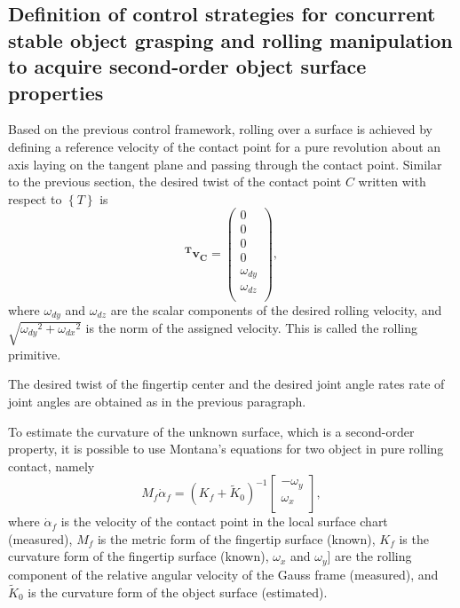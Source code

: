 \subsection{Definition of control strategies for concurrent stable object grasping and rolling manipulation to acquire second-order object surface properties}

Based on the previous control framework, rolling over a surface is achieved by defining a reference velocity of the contact point for a pure revolution about an axis laying on the tangent plane and passing through the contact point. Similar to the previous section, the desired twist of the contact point $C$ written with respect to $\left\lbrace T \right\rbrace$ is
\begin{equation}
    \bm{^Tv_C}=\left(
    \begin{array}{c}
        0\\
        0\\
        0\\
        0\\
        \omega_{dy}\\
        \omega_{dz}\\
    \end{array}\right),
\end{equation}
where $\omega_{dy}$ and $\omega_{dz}$ are the scalar components of the desired rolling velocity, and $\sqrt{{\omega_{dy}}^2+{\omega_{dx}}^2}$ is the norm of the assigned velocity. This is called the rolling primitive.

The desired twist of the fingertip center and the desired joint angle rates rate of joint angles are obtained as in the previous paragraph.

To estimate the curvature of the unknown surface, which is a second-order property, it is possible to use Montana's equations for two object in pure rolling contact, namely
\begin{equation}
M_f \dot{\alpha}_f=(K_f+\tilde{K}_0)^{-1}
\left[
\begin{array}{c}
-\omega_y\\
\omega_x\\
\end{array}
\right],
\label{eq:montana}
\end{equation}
where $\dot{\alpha}_f$ is the velocity of the contact point in the local surface chart (measured), $M_f$ is the metric form of the fingertip surface (known), $K_f$ is the curvature form of the fingertip surface (known), $\omega_x$ and $\omega_y$] are the rolling component of the relative angular velocity of the Gauss frame (measured), and $\tilde{K}_0$ is the curvature form of the object surface (estimated).

